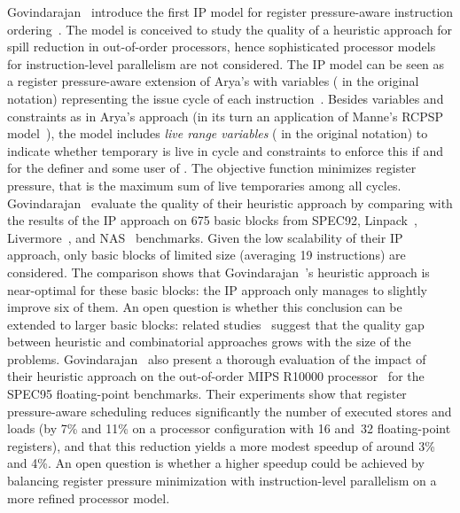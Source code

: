 \documentclass[acmsmall,authorversion,nonacm]{acmart}
\newcommand{\var}[2]{}
\begin{document}
Govindarajan~\etal{} introduce the first IP model for register
pressure-aware instruction ordering~\cite{Govindarajan2003}.
The model is conceived to study the quality of a heuristic approach
for spill reduction in out-of-order processors, hence sophisticated
processor models for instruction-level parallelism are not considered.
The IP model can be seen as a register pressure-aware extension of
Arya's with \var{s}{i} variables ( in the original notation)
representing the issue cycle of each instruction~.
Besides variables and constraints as in Arya's approach (in its turn
an application of Manne's RCPSP model~\cite{Manne1960}), the model
includes \emph{live range variables} \var{l}{t,k} ( in the
original notation) to indicate whether temporary  is live in cycle
 and constraints to enforce this if  and
 for the definer  and some user  of .
The objective function minimizes register pressure, that is the
maximum sum of live temporaries among all cycles.
Govindarajan~\etal{} evaluate the quality of their heuristic approach
by comparing with the results of the IP approach on 675 basic blocks
from SPEC92, Linpack~\cite{Dongarra2003},
Livermore~\cite{McMahon1986}, and NAS~\cite{Bailey1985} benchmarks.
Given the low scalability of their IP approach, only basic blocks of
limited size (averaging 19 instructions) are considered.
The comparison shows that Govindarajan~\etal{}'s heuristic approach is
near-optimal for these basic blocks: the IP approach only manages to
slightly improve six of them.
An open question is whether this conclusion can be extended to larger
basic blocks: related
studies~\cite{Wilken2000,Malik2008,Eriksson2011,Shobaki2013} suggest
that the quality gap between heuristic and combinatorial approaches
grows with the size of the problems.
Govindarajan~\etal{} also present a thorough evaluation of the impact
of their heuristic approach on the out-of-order MIPS R10000
processor~\cite{Yeager1996} for the SPEC95 floating-point benchmarks.
Their experiments show that register pressure-aware scheduling reduces
significantly the number of executed stores and loads (by 7\% and 11\%
on a processor configuration with 16 and~32 floating-point registers),
and that this reduction yields a more modest speedup of around 3\% and
4\%.
An open question is whether a higher speedup could be achieved by
balancing register pressure minimization with instruction-level
parallelism on a more refined processor model.
\end{document}
